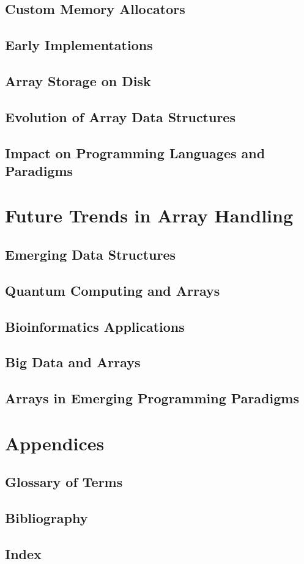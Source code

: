 \documentclass[12pt, oneside]{book}
\begin{document}
	\section{Custom Memory Allocators}\section{Early Implementations}
	\section{Array Storage on Disk}\section{Evolution of Array Data Structures}
	\section{Impact on Programming Languages and Paradigms}
	
	\chapter{Future Trends in Array Handling}
	\section{Emerging Data Structures}
	\section{Quantum Computing and Arrays}
	\section{Bioinformatics Applications}
	\section{Big Data and Arrays}
	\section{Arrays in Emerging Programming Paradigms}
	\chapter{Appendices}
	\section{Glossary of Terms}
	\section{Bibliography}
	\section{Index}
	
\printbibliography[heading=bibintoc]

\printindex
\end{document}
